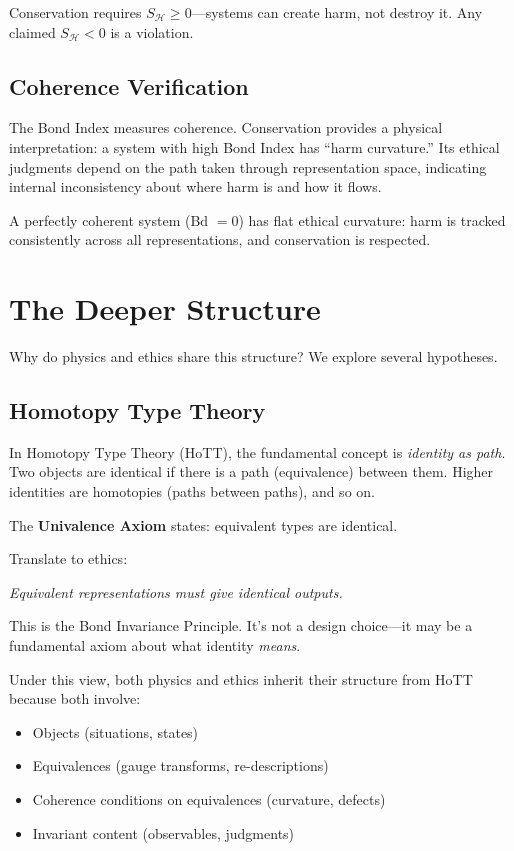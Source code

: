 \documentclass[12pt,letterpaper]{article}
\theoremstyle{definition}
\theoremstyle{remark}
\newcommand{\harm}{\mathcal{H}}
\begin{document}
Conservation requires $S_\harm \geq 0$---systems can create harm, not destroy it. Any claimed $S_\harm < 0$ is a violation.

\subsection{Coherence Verification}

The Bond Index measures coherence. Conservation provides a physical interpretation: a system with high Bond Index has ``harm curvature.'' Its ethical judgments depend on the path taken through representation space, indicating internal inconsistency about where harm is and how it flows.

A perfectly coherent system (Bd $= 0$) has flat ethical curvature: harm is tracked consistently across all representations, and conservation is respected.

\section{The Deeper Structure}

Why do physics and ethics share this structure? We explore several hypotheses.

\subsection{Homotopy Type Theory}

In Homotopy Type Theory (HoTT), the fundamental concept is \textit{identity as path}. Two objects are identical if there is a path (equivalence) between them. Higher identities are homotopies (paths between paths), and so on.

The \textbf{Univalence Axiom} states: equivalent types are identical.

Translate to ethics:
\begin{center}
\textit{Equivalent representations must give identical outputs.}
\end{center}

This is the Bond Invariance Principle. It's not a design choice---it may be a fundamental axiom about what identity \textit{means}.

Under this view, both physics and ethics inherit their structure from HoTT because both involve:
\begin{itemize}
    \item Objects (situations, states)
    \item Equivalences (gauge transforms, re-descriptions)
    \item Coherence conditions on equivalences (curvature, defects)
    \item Invariant content (observables, judgments)
\end{itemize}
\end{document}
